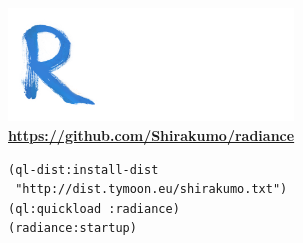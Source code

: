 \documentclass[12pt]{beamer}
\begin{document}
\begin{frame}[fragile]
  \begin{center}
    \includegraphics[height=3cm]{radiance.png} \\
    {\bfseries \url{https://github.com/Shirakumo/radiance}} \\
    \vspace{0.3cm}
    \begin{verbatim}
(ql-dist:install-dist 
 "http://dist.tymoon.eu/shirakumo.txt")
(ql:quickload :radiance)
(radiance:startup)
    \end{verbatim}
  \end{center}
\end{frame}
\end{document}
